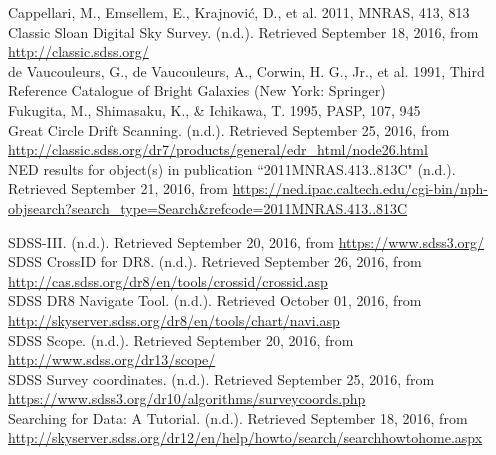 \documentclass[10pt,letterpaper]{article}
\begin{document}
\newpage
\center
\begin{thebibliography}{1}
 Cappellari, M., Emsellem, E., Krajnovi\'c, D., et al. 2011, MNRAS, 413, 813\\

 Classic Sloan Digital Sky Survey. (n.d.). Retrieved September 18, 2016, from \url{http://classic.sdss.org/}\\

 de Vaucouleurs, G., de Vaucouleurs, A., Corwin, H. G., Jr., et al. 1991, Third
Reference Catalogue of Bright Galaxies (New York: Springer)\\

 Fukugita, M., Shimasaku, K., \& Ichikawa, T. 1995, PASP, 107, 945\\

 Great Circle Drift Scanning. (n.d.). Retrieved September 25, 2016, from \url{http://classic.sdss.org/dr7/products/general/edr_html/node26.html}\\

 NED results for object(s) in publication ``2011MNRAS.413..813C" (n.d.). Retrieved September 21, 2016, from \url{https://ned.ipac.caltech.edu/cgi-bin/nph-objsearch?search_type=Search&refcode=2011MNRAS.413..813C}

 SDSS-III. (n.d.). Retrieved September 20, 2016, from \url{https://www.sdss3.org/}\\

 SDSS CrossID for DR8. (n.d.). Retrieved September 26, 2016, from \url{http://cas.sdss.org/dr8/en/tools/crossid/crossid.asp}\\

 SDSS DR8 Navigate Tool. (n.d.). Retrieved October 01, 2016, from \url{http://skyserver.sdss.org/dr8/en/tools/chart/navi.asp}\\

 SDSS Scope. (n.d.). Retrieved September 20, 2016, from \url{http://www.sdss.org/dr13/scope/}\\

 SDSS Survey coordinates. (n.d.). Retrieved September 25, 2016, from \url{https://www.sdss3.org/dr10/algorithms/surveycoords.php}\\

 Searching for Data: A Tutorial. (n.d.). Retrieved September 18, 2016, from \url{http://skyserver.sdss.org/dr12/en/help/howto/search/searchhowtohome.aspx}\\


\end{thebibliography}
\end{document}
